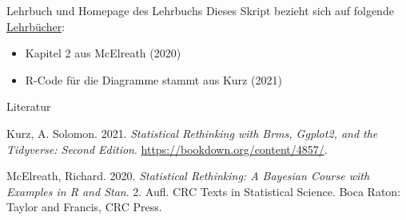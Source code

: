\documentclass[
  ngerman,
  ignorenonframetext,
]{beamer}
\providecommand{\tightlist}{%
  \setlength{\itemsep}{0pt}\setlength{\parskip}{0pt}}
\newlength{\cslhangindent}
\newenvironment{CSLReferences}[2] %
 {%
  \setlength{\parindent}{0pt}
  \ifodd #1 \everypar{\setlength{\hangindent}{\cslhangindent}}\ignorespaces\fi
  \ifnum #2 > 0
  \setlength{\parskip}{#2\baselineskip}
  \fi
 }%
 {}
\begin{document}
\begin{frame}{Lehrbuch und Homepage des Lehrbuchs}
\protect\hypertarget{lehrbuch-und-homepage-des-lehrbuchs}{}
Dieses Skript bezieht sich auf folgende
\protect\hyperlink{literatur}{Lehrbücher}:

\begin{itemize}
\tightlist
\item
  Kapitel 2 aus McElreath (2020)
\item
  R-Code für die Diagramme stammt aus Kurz (2021)
\end{itemize}
\end{frame}

\begin{frame}{Literatur}
\protect\hypertarget{literatur}{}
\hypertarget{refs}{}
\begin{CSLReferences}{1}{0}
\leavevmode{}%
Kurz, A. Solomon. 2021. \emph{Statistical Rethinking with Brms, Ggplot2,
and the Tidyverse: {Second} Edition}.
\url{https://bookdown.org/content/4857/}.

\leavevmode{}%
McElreath, Richard. 2020. \emph{Statistical Rethinking: A {Bayesian}
Course with Examples in {R} and {Stan}}. 2. Aufl. {CRC} Texts in
Statistical Science. {Boca Raton}: {Taylor and Francis, CRC Press}.

\end{CSLReferences}
\end{frame}
\end{document}
